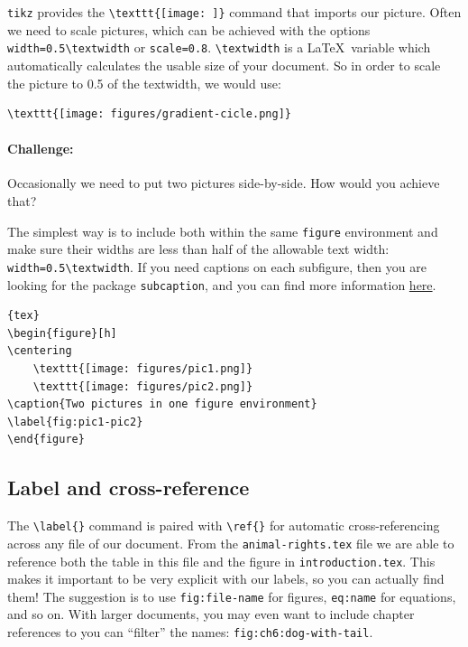 \verb|tikz| provides the \verb|\texttt{[image: ]}| command that imports our picture.
Often we need to scale pictures, which can be achieved with the options \verb|width=0.5\textwidth| or \verb|scale=0.8|.
\verb|\textwidth| is a \LaTeX\ variable which automatically calculates the usable size of your document.
So in order to scale the picture to 0.5 of the textwidth, we would use:
\begin{lstlisting}
\texttt{[image: figures/gradient-cicle.png]}
\end{lstlisting}

\paragraph{Challenge:}
Occasionally we need to put two pictures side-by-side. How would you achieve that?

The simplest way is to include both within the same \verb|figure| environment and make sure their widths are less than half of the allowable text width: \verb|width=0.5\textwidth|.
If you need captions on each subfigure, then you are looking for the package \verb|subcaption|, and you can find more information \href{http://mirrors.ibiblio.org/CTAN/macros/latex/contrib/caption/subcaption.pdf}{here}.

\begin{lstlisting}{tex}
\begin{figure}[h]
\centering
    \texttt{[image: figures/pic1.png]}
    \texttt{[image: figures/pic2.png]}
\caption{Two pictures in one figure environment}
\label{fig:pic1-pic2}
\end{figure}
\end{lstlisting}   

\subsection{Label and cross-reference}
The \verb|\label{}| command is paired with \verb|\ref{}| for automatic cross-referencing across any file of our document.
From the \verb|animal-rights.tex| file we are able to reference both the table in this file and the figure in \verb|introduction.tex|.
This makes it important to be very explicit with our labels, so you can actually find them!
The suggestion is to use \verb|fig:file-name| for figures, \verb|eq:name| for equations, and so on.
With larger documents, you may even want to include chapter references to you can ``filter'' the names: \verb|fig:ch6:dog-with-tail|.

